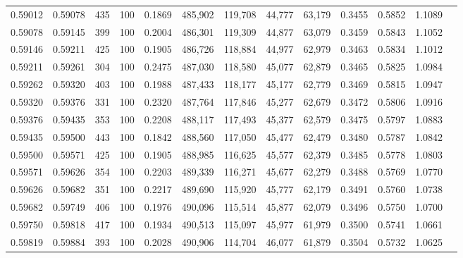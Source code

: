 \begin{tabular}{rrrrrrrrrrrrr}
0.59012 & 0.59078 &   435 & 100 &                                     0.1869 & 485,902 & 119,708 &  44,777 &  63,179 & 0.3455 & 0.5852 & 1.1089 \\
0.59078 & 0.59145 &   399 & 100 &                                     0.2004 & 486,301 & 119,309 &  44,877 &  63,079 & 0.3459 & 0.5843 & 1.1052 \\
0.59146 & 0.59211 &   425 & 100 &                                     0.1905 & 486,726 & 118,884 &  44,977 &  62,979 & 0.3463 & 0.5834 & 1.1012 \\
0.59211 & 0.59261 &   304 & 100 &                                     0.2475 & 487,030 & 118,580 &  45,077 &  62,879 & 0.3465 & 0.5825 & 1.0984 \\
0.59262 & 0.59320 &   403 & 100 &                                     0.1988 & 487,433 & 118,177 &  45,177 &  62,779 & 0.3469 & 0.5815 & 1.0947 \\
0.59320 & 0.59376 &   331 & 100 &                                     0.2320 & 487,764 & 117,846 &  45,277 &  62,679 & 0.3472 & 0.5806 & 1.0916 \\
0.59376 & 0.59435 &   353 & 100 &                                     0.2208 & 488,117 & 117,493 &  45,377 &  62,579 & 0.3475 & 0.5797 & 1.0883 \\
0.59435 & 0.59500 &   443 & 100 &                                     0.1842 & 488,560 & 117,050 &  45,477 &  62,479 & 0.3480 & 0.5787 & 1.0842 \\
0.59500 & 0.59571 &   425 & 100 &                                     0.1905 & 488,985 & 116,625 &  45,577 &  62,379 & 0.3485 & 0.5778 & 1.0803 \\
0.59571 & 0.59626 &   354 & 100 &                                     0.2203 & 489,339 & 116,271 &  45,677 &  62,279 & 0.3488 & 0.5769 & 1.0770 \\
0.59626 & 0.59682 &   351 & 100 &                                     0.2217 & 489,690 & 115,920 &  45,777 &  62,179 & 0.3491 & 0.5760 & 1.0738 \\
0.59682 & 0.59749 &   406 & 100 &                                     0.1976 & 490,096 & 115,514 &  45,877 &  62,079 & 0.3496 & 0.5750 & 1.0700 \\
0.59750 & 0.59818 &   417 & 100 &                                     0.1934 & 490,513 & 115,097 &  45,977 &  61,979 & 0.3500 & 0.5741 & 1.0661 \\
0.59819 & 0.59884 &   393 & 100 &                                     0.2028 & 490,906 & 114,704 &  46,077 &  61,879 & 0.3504 & 0.5732 & 1.0625 \\

\end{tabular}
